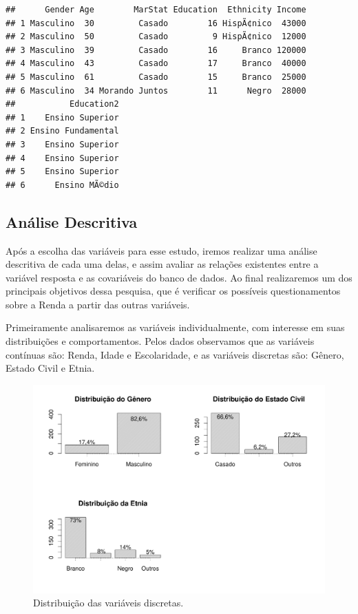 \documentclass[]{article}
\begin{document}
\begin{verbatim}
##      Gender Age        MarStat Education  Ethnicity Income
## 1 Masculino  30         Casado        16 HispÃ¢nico  43000
## 2 Masculino  50         Casado         9 HispÃ¢nico  12000
## 3 Masculino  39         Casado        16     Branco 120000
## 4 Masculino  43         Casado        17     Branco  40000
## 5 Masculino  61         Casado        15     Branco  25000
## 6 Masculino  34 Morando Juntos        11      Negro  28000
##           Education2
## 1    Ensino Superior
## 2 Ensino Fundamental
## 3    Ensino Superior
## 4    Ensino Superior
## 5    Ensino Superior
## 6      Ensino MÃ©dio
\end{verbatim}

\subsection{Análise Descritiva}\label{analise-descritiva}

Após a escolha das variáveis para esse estudo, iremos realizar uma
análise descritiva de cada uma delas, e assim avaliar as relações
existentes entre a variável resposta e as covariáveis do banco de dados.
Ao final realizaremos um dos principais objetivos dessa pesquisa, que é
verificar os possíveis questionamentos sobre a Renda a partir das outras
variáveis.

Primeiramente analisaremos as variáveis individualmente, com interesse
em suas distribuições e comportamentos. Pelos dados observamos que as
variáveis contínuas são: Renda, Idade e Escolaridade, e as variáveis
discretas são: Gênero, Estado Civil e Etnia.

\begin{figure}[H]

{\centering \includegraphics[width=0.6\linewidth]{p100-graf} 

}

\caption{Distribuição das variáveis discretas.}\label{fig:unnamed-chunk-6}
\end{figure}
\end{document}
